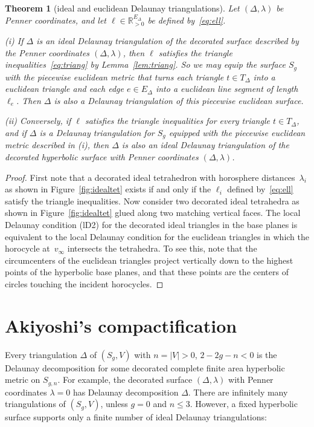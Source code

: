 \documentclass[a4paper, 11pt]{article}
\newcommand{\R}{\mathbb{R}}
\theoremstyle{plain}
\newtheorem{theorem}{Theorem}[section]
\theoremstyle{definition}
\begin{document}
\begin{theorem}[ideal and euclidean Delaunay triangulations]
  \label{thm:idealeucdel}
  Let $(\Delta,\lambda)$ be Penner coordinates, and let
  $\ell\in\R_{>0}^{E_{\Delta}}$ be defined by~\eqref{eq:ell}.

  (i) If $\Delta$ is an ideal Delaunay triangulation of the decorated
  surface described by the Penner coordinates $(\Delta,\lambda)$, then
  $\ell$ satisfies the triangle inequalities~\eqref{eq:triang} by
  Lemma~\ref{lem:triang}. So we may equip the surface $S_{g}$ with the
  piecewise euclidean metric that turns each triangle
  $t\in T_{\Delta}$ into a euclidean triangle and each edge
  $e\in E_{\Delta}$ into a euclidean line segment of length
  $\ell_{e}$. Then $\Delta$ is also a Delaunay triangulation of this
  piecewise euclidean surface.

  (ii) Conversely, if $\ell$ satisfies the triangle inequalities for
  every triangle $t\in T_{\Delta}$, and if $\Delta$ is a Delaunay
  triangulation for $S_{g}$ equipped with the piecewise euclidean
  metric described in (i), then $\Delta$ is also an ideal Delaunay
  triangulation of the decorated hyperbolic surface with Penner
  coordinates $(\Delta,\lambda)$.
\end{theorem}

\begin{proof}
  First note that a decorated ideal tetrahedron with horosphere
  distances~$\lambda_{i}$ as shown in Figure~\ref{fig:idealtet} exists
  if and only if the $\ell_{i}$ defined by~\eqref{eq:ell} satisfy the
  triangle inequalities. Now consider two decorated ideal tetrahedra
  as shown in Figure~\ref{fig:idealtet} glued along two matching
  vertical faces. The local Delaunay condition (lD2) for the decorated
  ideal triangles in the base planes is equivalent to the local
  Delaunay condition for the euclidean triangles in which the
  horocycle at~$v_{\infty}$ intersects the tetrahedra. To see this,
  note that the circumcenters of the euclidean triangles project
  vertically down to the highest points of the hyperbolic base planes,
  and that these points are the centers of circles touching the
  incident horocycles.
\end{proof}

\section{Akiyoshi's compactification}
\label{sec:akiyoshi}

Every triangulation $\Delta$ of $(S_{g},V)$ with $n=|V|>0$, $2-2g-n<0$
is the Delaunay decomposition for some decorated complete finite area
hyperbolic metric on $S_{g,n}$. For example, the decorated surface
$(\Delta,\lambda)$ with Penner coordinates $\lambda=0$ has Delaunay
decomposition $\Delta$. There are infinitely many triangulations of
$(S_{g},V)$, unless $g=0$ and $n\leq3$. However, a fixed hyperbolic
surface supports only a finite number of ideal Delaunay
triangulations:
\end{document}
